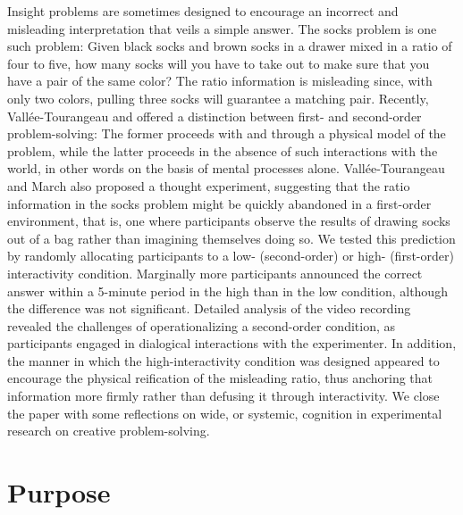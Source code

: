 \documentclass{article}
\begin{document}
Insight problems are sometimes designed to encourage an incorrect and misleading interpretation that veils a simple answer. The socks problem is one such problem: Given black socks and brown socks in a drawer mixed in a ratio of four to five, how many socks will you have to take out to make sure that you have a pair of the same color? The ratio information is misleading since, with only two colors, pulling three socks will guarantee a matching pair. Recently, Vallée-Tourangeau and \parencite{March2020} offered a distinction between first- and second-order problem-solving: The former proceeds with and through a physical model of the problem, while the latter proceeds in the absence of such interactions with the world, in other words on the basis of mental processes alone. Vallée-Tourangeau and March also proposed a thought experiment, suggesting that the ratio information in the socks problem might be quickly abandoned in a first-order environment, that is, one where participants observe the results of drawing socks out of a bag rather than imagining themselves doing so. We tested this prediction by randomly allocating participants to a low- (second-order) or high- (first-order) interactivity condition. Marginally more participants announced the correct answer within a 5-minute period in the high than in the low condition, although the difference was not significant. Detailed analysis of the video recording revealed the challenges of operationalizing a second-order condition, as participants engaged in dialogical interactions with the experimenter. In addition, the manner in which the high-interactivity condition was designed appeared to encourage the physical reification of the misleading ratio, thus anchoring that information more firmly rather than defusing it through interactivity. We close the paper with some reflections on wide, or systemic, cognition in experimental research on creative problem-solving. 



\section{Purpose }
\end{document}
